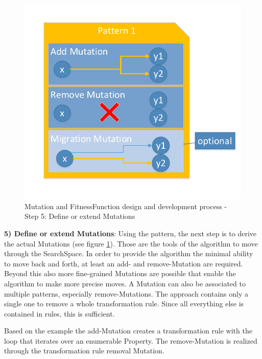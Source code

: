 \begin{figure}[!ht]
	\centering
	\includegraphics[scale=0.5, trim=0cm 1cm 0cm 1cm, clip=true]{Images/MutationAndFitnessFunctionDesignProcess-Step5.pdf} 
	\caption{\Gls{Mutation} and \gls{FitnessFunction} design and development process - Step 5: Define or extend \glspl{Mutation}}
	\label{figMutationAndFitnessFunctionDesignProcess-Step5}
\end{figure}

\textbf{5) Define or extend \glspl{Mutation}}: Using the pattern, the next step is to derive the actual \glspl{Mutation} (see figure \ref{figMutationAndFitnessFunctionDesignProcess-Step5}). Those are the tools of the algorithm to move through the \gls{SearchSpace}. In order to provide the algorithm the minimal ability to move back and forth, at least an add- and remove-\gls{Mutation} are required. Beyond this also more fine-grained \glspl{Mutation} are possible that enable the algorithm to make more precise moves. A \gls{Mutation} can also be associated to multiple patterns, especially remove-\glspl{Mutation}. The approach contains only a single one to remove a whole transformation rule. Since all everything else is contained in rules, this is sufficient.

Based on the example the add-\gls{Mutation} creates a transformation rule with the loop that iterates over an enumerable \gls{Property}. The remove-\gls{Mutation} is realized through the transformation rule removal \gls{Mutation}.

